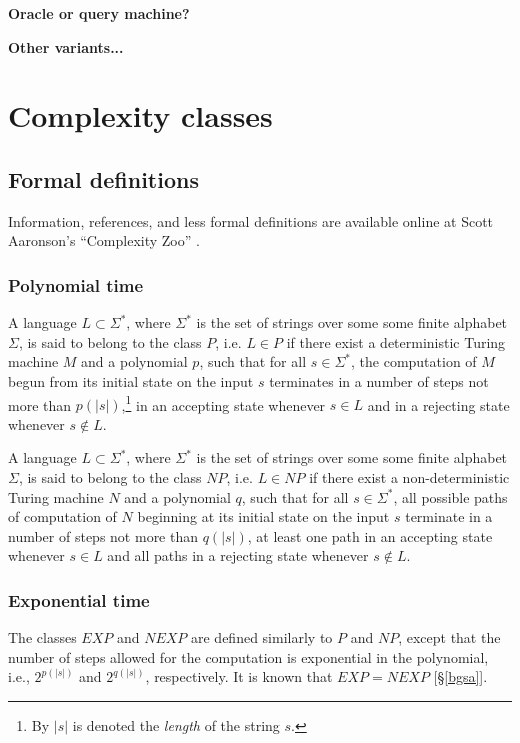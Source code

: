 \documentclass[letterpaper]{article}
\begin{document}
\begin{definition}
	\textbf{Oracle or query machine?}
\end{definition}
\begin{definition}
	{\color{red}\textbf{Other variants...}}
\end{definition}

\section{Complexity classes}
\subsection{Formal definitions}
Information, references, and less formal definitions are available online at Scott Aaronson's ``Complexity Zoo'' \cite{aaronson-zoo}.
\subsubsection{Polynomial time}
\begin{definition}
A language $L\subset\Sigma^{*}$, where $\Sigma^{*}$ is the set of strings over some some finite alphabet $\Sigma$, is said to belong to the class $P$, i.e. $L\in P$ if there exist a deterministic Turing machine $M$ and a polynomial $p$, such that for all $s\in\Sigma^{*}$, the computation of $M$ begun from its initial state on the input $s$ terminates in a number of steps not more than $p(|s|)$,\footnote{By $|s|$ is denoted the \textit{length} of the string $s$.} in an accepting state whenever $s\in L$ and in a rejecting state whenever $s\notin L$.
\end{definition}
\begin{definition}
A language $L\subset\Sigma^{*}$, where $\Sigma^{*}$ is the set of strings over some some finite alphabet $\Sigma$, is said to belong to the class $NP$, i.e. $L\in NP$ if there exist a non-deterministic Turing machine $N$ and a polynomial $q$, such that for all $s\in\Sigma^{*}$, all possible paths of computation of $N$ beginning at its initial state on the input $s$ terminate in a number of steps not more than $q(|s|)$, at least one path in an accepting state whenever $s\in L$ and all paths in a rejecting state whenever $s\notin L$.
\end{definition}
\subsubsection{Exponential time}
\begin{definition}
The classes $EXP$ and $NEXP$ are defined similarly to $P$ and $NP$, except that the number of steps allowed for the computation is exponential in the polynomial, i.e., $2^{p(|s|)}$ and $2^{q(|s|)}$, respectively. It is known that $EXP=NEXP$ [\S \ref{bgsa}].
\end{definition}
\end{document}
